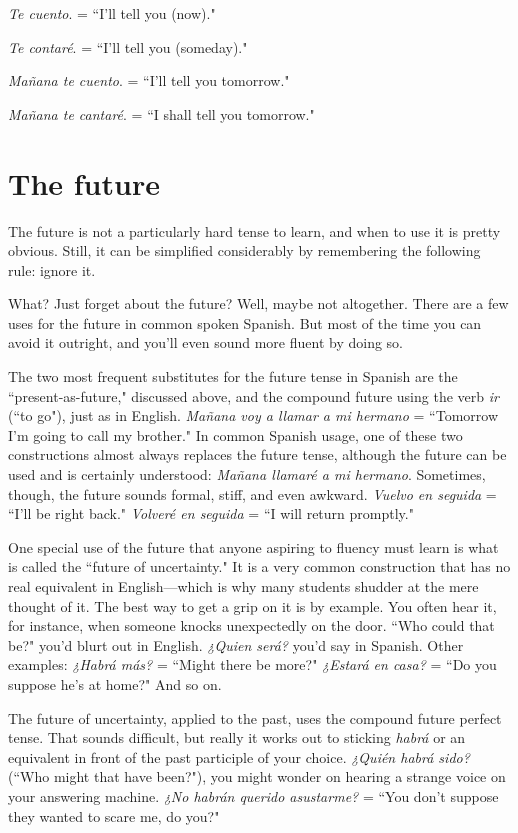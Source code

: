 \bsk

\indu \emph{Te cuento}. = ``I'll tell you (now)."

\indu \emph{Te contaré}. = ``I'll tell you (someday)."

\indu \emph{Mañana te cuento}. = ``I'll tell you tomorrow."

\indu \emph{Mañana te cantaré}. = ``I shall tell you tomorrow."

\section{The future}

The future is not a particularly hard tense to learn, and when
to use it is pretty obvious. Still, it can be simplified considerably by
remembering the following rule: ignore it.

What? Just forget about the future? Well, maybe not altogether. There are a few uses for the future in common spoken Spanish.
But most of the time you can avoid it outright, and you'll even sound
more fluent by doing so.

The two most frequent substitutes for the future tense in
Spanish are the ``present-as-future," discussed above, and the compound future using the verb \emph{ir} (``to go"), just as in English. \emph{Mañana voy
a llamar a mi hermano} = ``Tomorrow I'm going to call my brother."
In common Spanish usage, one of these two constructions almost always replaces the future tense, although the future can be used and is
certainly understood: \emph{Mañana llamaré a mi hermano}. Sometimes,
though, the future sounds formal, stiff, and even awkward. \emph{Vuelvo en
seguida} = ``I'll be right back." \emph{Volveré en seguida} = ``I will return
promptly."

One special use of the future that anyone aspiring to fluency
must learn is what is called the ``future of uncertainty." It is a very
common construction that has no real equivalent in English---which is
why many students shudder at the mere thought of it. The best way to
get a grip on it is by example. You often hear it, for instance, when
someone knocks unexpectedly on the door. ``Who could that be?"
you'd blurt out in English. \emph{¿Quien será?} you'd say in Spanish. Other
examples: \emph{¿Habrá más?} = ``Might there be more?" \emph{¿Estará en casa?} =
``Do you suppose he's at home?" And so on.

The future of uncertainty, applied to the past, uses the compound future perfect tense. That sounds difficult, but really it works
out to sticking \emph{habrá} or an equivalent in front of the past participle of
your choice. \emph{¿Quién habrá sido?} (``Who might that have been?"), you
might wonder on hearing a strange voice on your answering machine.
\emph{¿No habrán querido asustarme?} = ``You don't suppose they wanted to
scare me, do you?"

